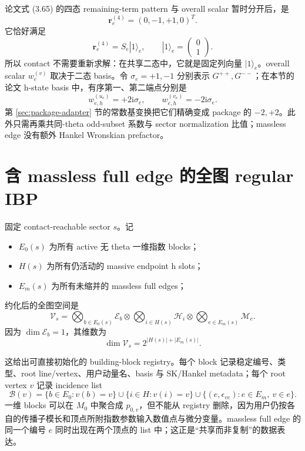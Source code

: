 \documentclass[11pt,a4paper]{ctexart}
\newcommand{\ii}{\mathrm i}
\newcommand{\cV}{\mathcal V}
\newcommand{\cE}{\mathcal E}
\newcommand{\cH}{\mathcal H}
\newcommand{\cM}{\mathcal M}
\newcommand{\cB}{\mathcal B}
\begin{document}
论文式 (3.65) 的四态 remaining-term pattern 与 overall scalar 暂时分开后，是
\begin{equation}
 \bm r_e^{(4)}=(0,-1,+1,0)^T.
\end{equation}
它恰好满足
\begin{equation}
 \bm r_e^{(4)}=S_e|1\rangle_e,
 \qquad
 |1\rangle_e=\begin{pmatrix}0\\1\end{pmatrix}.
 \label{eq:contact-vector-projection}
\end{equation}
所以 contact 不需要重新求解：在共享二态中，它就是固定列向量 $|1\rangle_e$。overall scalar $w_e^{(v)}$ 取决于二态 basis。令 $\sigma_e=+1,-1$ 分别表示 $G^{++},G^{--}$；在本节的论文 h-state basis 中，有序第一、第二端点分别是
\begin{equation}
 w_{e,h}^{(u_e)}=+2\ii\sigma_e,
 \qquad
 w_{e,h}^{(v_e)}=-2\ii\sigma_e.
 \label{eq:h-massless-contact-weight}
\end{equation}
第 \ref{sec:package-adapter} 节的常数基变换把它们精确变成 package 的 $-2,+2$。此外只需再乘共同-theta odd-subset 系数与 sector normalization 比值；massless edge 没有额外 Hankel Wronskian prefactor。

\section{含 massless full edge 的全图 regular IBP}

固定 contact-reachable sector $s$。记
\begin{itemize}
  \item $E_0(s)$ 为所有 active 无 theta 一维指数 blocks；
  \item $H(s)$ 为所有仍活动的 massive endpoint h slots；
  \item $E_m(s)$ 为所有未缩并的 massless full edges；
\end{itemize}
约化后的全图空间是
\begin{equation}
 \boxed{
 \cV_s
 =\bigotimes_{b\in E_0(s)}\cE_b
 \otimes\bigotimes_{i\in H(s)}\cH_i
 \otimes\bigotimes_{e\in E_m(s)}\cM_e.
 }
 \label{eq:global-reduced-space}
\end{equation}
因为 $\dim\cE_b=1$，其维数为
\begin{equation}
 \dim\cV_s=2^{|H(s)|+|E_m(s)|}.
\end{equation}

这给出可直接初始化的 building-block registry。每个 block 记录稳定编号、类型、root line/vertex、用户动量名、basis 与 SK/Hankel metadata；每个 root vertex $v$ 记录 incidence list
\begin{equation}
 \cB(v)=
 \{b\in E_0:v(b)=v\}
 \cup\{i\in H:v(i)=v\}
 \cup\{(e,\epsilon_{ve}):e\in E_m,\ v\in e\}.
 \label{eq:vertex-block-incidence}
\end{equation}
一维 blocks 可以在 $M_0$ 中聚合成 $p_{0,v}$，但不能从 registry 删除，因为用户仍按各自的传播子模长和顶点所附指数参数输入数值点与微分变量。massless full edge 的同一个编号 $e$ 同时出现在两个顶点的 list 中；这正是“共享而非复制”的数据表达。
\end{document}
